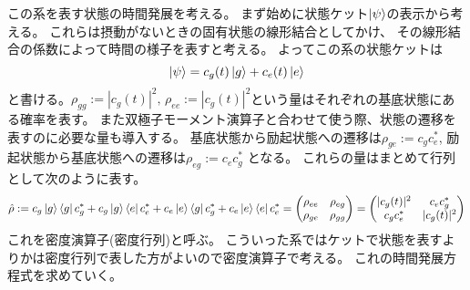 \documentclass[11pt,dvipdfmx,a4paper]{jsarticle}
\begin{document}
この系を表す状態の時間発展を考える。
まず始めに状態ケット\(\ket{\psi}\)の表示から考える。
これらは摂動がないときの固有状態の線形結合としてかけ、
その線形結合の係数によって時間の様子を表すと考える。
よってこの系の状態ケットは
\begin{equation}
	\ket{\psi} = c_g (t) \ket{g} + c_e (t) \ket{e}
\end{equation}
と書ける。\(\rho_{gg}:=|c_g(t)|^2,\,\rho_{ee}:=|c_g(t)|^2\)という量はそれぞれの基底状態にある確率を表す。
また双極子モーメント演算子と合わせて使う際、状態の遷移を表すのに必要な量も導入する。
基底状態から励起状態への遷移は\(\rho_{ge} := c_g c_e^*\),
励起状態から基底状態への遷移は\(\rho_{eg} := c_e c_g^*\)
となる。
これらの量はまとめて行列として次のように表す。
\begin{equation}
	\hat{\rho} := c_g \ket{g}\bra{g} c_g^*
	+ c_g \ket{g}\bra{e} c_e^*
	+ c_e \ket{e}\bra{g} c_g^*
	+ c_e \ket{e}\bra{e} c_e^*
	=
	\begin{pmatrix}
		\rho_{ee} & \rho_{eg}\\
		\rho_{ge} & \rho_{gg}
	\end{pmatrix}
	=
	\begin{pmatrix}
		|c_g(t)|^2 & c_e c_g^*\\
		c_g c_e^* & |c_g(t)|^2
	\end{pmatrix}
\end{equation}
これを密度演算子(密度行列)と呼ぶ。
こういった系ではケットで状態を表すよりかは密度行列で表した方がよいので密度演算子で考える。
これの時間発展方程式を求めていく。
\end{document}
